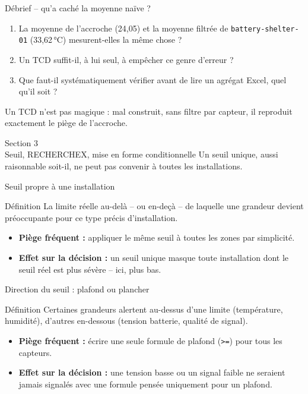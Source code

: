\documentclass[aspectratio=169]{beamer}
\begin{document}
\begin{frame}{Débrief -- qu'a caché la moyenne naïve ?}
  \begin{enumerate}
    \item La moyenne de l'accroche (24,05) et la moyenne filtrée de \texttt{battery-shelter-01} (33,62\,°C) mesurent-elles la même chose ?
    \item Un TCD suffit-il, à lui seul, à empêcher ce genre d'erreur ?
    \item Que faut-il systématiquement vérifier avant de lire un agrégat Excel, quel qu'il soit ?
  \end{enumerate}
  \vfill
  \alert{Un TCD n'est pas magique : mal construit, sans filtre par capteur, il reproduit exactement le piège de l'accroche.}
\end{frame}

\begin{frame}[plain]
  \centering
  \Huge Section 3\\[3mm]
  \Large Seuil, RECHERCHEX, mise en forme conditionnelle
  \vfill
  \normalsize Un seuil unique, aussi raisonnable soit-il, ne peut pas convenir à toutes les installations.
\end{frame}

\begin{frame}{Seuil propre à une installation}
  \begin{block}{Définition}
    La limite réelle au-delà -- ou en-deçà -- de laquelle une grandeur devient préoccupante pour ce type précis d'installation.
  \end{block}
  \begin{itemize}
    \item \textbf{Piège fréquent :} appliquer le même seuil à toutes les zones par simplicité.
    \item \textbf{Effet sur la décision :} un seuil unique masque toute installation dont le seuil réel est plus sévère -- ici, plus bas.
  \end{itemize}
\end{frame}

\begin{frame}{Direction du seuil : plafond ou plancher}
  \begin{block}{Définition}
    Certaines grandeurs alertent au-dessus d'une limite (température, humidité), d'autres en-dessous (tension batterie, qualité de signal).
  \end{block}
  \begin{itemize}
    \item \textbf{Piège fréquent :} écrire une seule formule de plafond (\texttt{>=}) pour tous les capteurs.
    \item \textbf{Effet sur la décision :} une tension basse ou un signal faible ne seraient jamais signalés avec une formule pensée uniquement pour un plafond.
  \end{itemize}
\end{frame}
\end{document}
